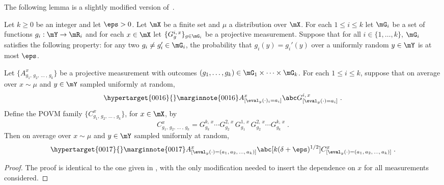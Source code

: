 The following lemma is a slightly modified version of~\cite[Fact~4.34]{NW19}.
\begin{lemma}
\hypertarget{0015}{}
\reversemarginpar{}
  \label{lem:ld-sandwich}
  Let $k \geq 0$ be an integer and let $\eps>0$.
  Let $\mX$ be a finite set and $\mu$ a distribution over $\mX$.
  For each $1 \leq i \leq k$ let $\mG_i$ be a set of functions $g_i : \mY
  \rightarrow \mR_i$ and for each $x \in \mX$ let $\{G^{i,\, x}_g\}_{g\in
    \mG_i}$ be a projective measurement.
  Suppose that for all $i\in \{1,\ldots,k\}$, $\mG_i$ satisfies the following
  property: for any two $g_i \neq g_i' \in \mG_i$, the probability that $g_i(y)
  = g_i'(y)$ over a uniformly random $y \in \mY$ is at most $\eps$.

  Let $\bigl\{ A^{x}_{g_1,\, g_2,\, \ldots\,,\, g_k} \bigr\}$ be a projective
  measurement with outcomes $(g_1,\ldots,g_k) \in \mG_1\times\cdots\times
  \mG_k$.
  For each $1 \leq i \leq k$, suppose that on average over $x \sim \mu$ and
  $y\in \mY$ sampled uniformly at random,
  \begin{equation}
\hypertarget{0016}{}
\reversemarginpar\marginnote{\textnormal{0016}}
    \label{eq:ld-sandwich-1}
    A^{x}_{[\eval_y(\cdot)_i = a_i]} \abc G^{i,\, x}_{[\eval_y(\cdot)=a_i]}\;.
  \end{equation}
  Define the POVM family $\{C^x_{g_1,\, g_2,\, \ldots\,,\, g_k}\}$, for $x\in \mX$, by
  \begin{equation*}
    C^x_{g_1,\, g_2,\, \ldots\,,\, g_k} = G^{k,\, x}_{g_k} \cdots
    G^{2,\, x}_{g_2} \, G^{1,\, x}_{g_1} \, G^{2,\, x}_{g_2} \cdots
    G^{k,\, x}_{g_k}\;.
  \end{equation*}
  Then on average over $x\sim \mu$ and $y\in \mY$ sampled uniformly at random,
  \begin{equation}
\hypertarget{0017}{}
\reversemarginpar\marginnote{\textnormal{0017}}
    \label{eq:ld-sandwich-2}
    A^x_{[\eval_y(\cdot) = (a_1,\, a_2,\, \ldots,\, a_k)]} \abc[k(\delta+\eps)^{1/2}]
    C^x_{[\eval_y(\cdot) = (a_1,\, a_2,\, \ldots,\, a_k)]}\;.
\end{equation}
\end{lemma}

\begin{proof}
  The proof is identical to the one given in \cite[Fact~4.34]{NW19}, with the
  only modification needed to insert the dependence on $x$ for all measurements
  considered.
\end{proof}


